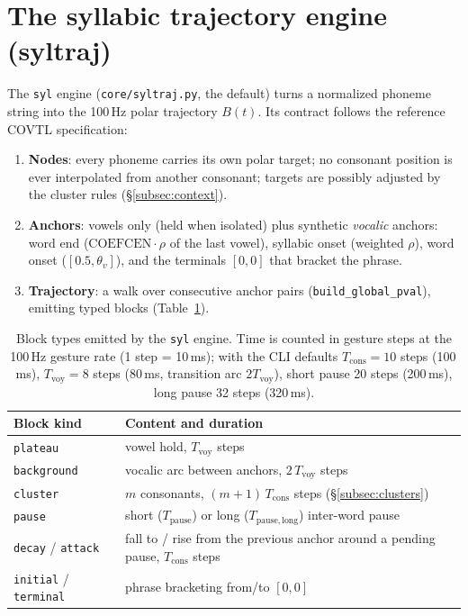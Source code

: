 \documentclass[11pt,a4paper]{article}
\begin{document}
\section{The syllabic trajectory engine (syltraj)}\label{sec:syltraj}

The \texttt{syl} engine (\texttt{core/syltraj.py}, the default) turns a
normalized phoneme string into the 100\,Hz polar trajectory
\(B(t)\). Its contract follows the reference COVTL specification:

\begin{enumerate}[leftmargin=1.5em]
\item \textbf{Nodes}: every phoneme carries its own polar target; no
      consonant position is ever interpolated from another consonant;
      targets are possibly adjusted by the cluster rules
      (\S\ref{subsec:context}).
\item \textbf{Anchors}: vowels only (held when isolated) plus synthetic
      \emph{vocalic} anchors: word end
      (\(\mathrm{COEFCEN}\cdot\rho\) of the last vowel), syllabic onset
      (weighted \(\rho\)), word onset (\([0.5, \theta_v]\)), and the
      terminals \([0, 0]\) that bracket the phrase.
\item \textbf{Trajectory}: a walk over consecutive anchor pairs
      (\texttt{build\_global\_pval}), emitting typed blocks
      (Table~\ref{tab:blocks}).
\end{enumerate}

\begin{table}[t]
\centering
\small
\begin{tabularx}{\textwidth}{lX}
\toprule
\textbf{Block kind} & \textbf{Content and duration} \\
\midrule
\texttt{plateau}   & vowel hold, \(T_{\mathrm{voy}}\) steps \\
\texttt{background}& vocalic arc between anchors, \(2\,T_{\mathrm{voy}}\) steps \\
\texttt{cluster}   & \(m\) consonants, \((m+1)\,T_{\mathrm{cons}}\) steps (\S\ref{subsec:clusters}) \\
\texttt{pause}     & short (\(T_{\mathrm{pause}}\)) or long (\(T_{\mathrm{pause,long}}\)) inter-word pause \\
\texttt{decay} / \texttt{attack} & fall to / rise from the previous anchor around a pending pause, \(T_{\mathrm{cons}}\) steps \\
\texttt{initial} / \texttt{terminal} & phrase bracketing from/to \([0,0]\) \\
\bottomrule
\end{tabularx}
\caption{Block types emitted by the \texttt{syl} engine. Time is counted
in gesture steps at the 100\,Hz gesture rate (1 step = 10\,ms); with the
CLI defaults \(T_{\mathrm{cons}} = 10\) steps (100\,ms),
\(T_{\mathrm{voy}} = 8\) steps (80\,ms, transition arc
\(2T_{\mathrm{voy}}\)), short pause 20 steps (200\,ms), long pause 32
steps (320\,ms).}
\label{tab:blocks}
\end{table}
\end{document}
